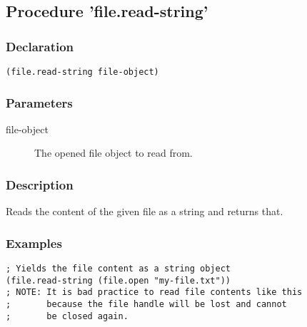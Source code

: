 \subsection{Procedure 'file.read-string'}
\label{builtins/file.read-string}

\subsubsection*{Declaration}
\begin{lstlisting}
(file.read-string file-object)
\end{lstlisting}

\subsubsection*{Parameters}
\begin{description}
	\item[file-object] The opened file object to read from.
\end{description}

\subsubsection*{Description}
Reads the content of the given file as a string and returns that.

\subsubsection*{Examples}
\begin{lstlisting}
; Yields the file content as a string object
(file.read-string (file.open "my-file.txt"))
; NOTE: It is bad practice to read file contents like this
;       because the file handle will be lost and cannot
;       be closed again.
\end{lstlisting}
